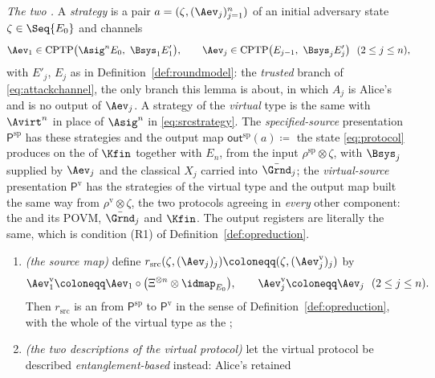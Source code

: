 \begin{lemma}
\emph{The two .} A \emph{strategy}
is a pair
$a=(\zeta,(\Aev_j)_{j=1}^{n})$ of an initial adversary state
$\zeta\in\Seq{E_0}$ and channels
\begin{equation}\label{eq:srcstrategy}
  \Aev_1\in\mathrm{CPTP}\big(\Asig^{n}E_0,\ \Bsys_1E'_1\big),
  \qquad
  \Aev_j\in\mathrm{CPTP}\big(E_{j-1},\ \Bsys_jE'_j\big)\ \ (2\le j\le n),
\end{equation}
with $E'_j$, $E_j$ as in Definition~\ref{def:roundmodel}: the \emph{trusted}
branch of \eqref{eq:attackchannel}, the only branch this lemma is about, in
which $A_j$ is Alice's and is no output of $\Aev_j$. A strategy of the
\emph{virtual} type is the same with $\Avirt^{n}$ in place of $\Asig^{n}$ in
\eqref{eq:srcstrategy}. The \emph{specified-source} presentation
$\mathsf{P}^{\mathrm{sp}}$ has these strategies and the output map
$\mathsf{out}^{\mathrm{sp}}(a)\coloneqq$ the state \eqref{eq:protocol} produces
on the  of $\Kfin$ together with $E_n$, from the input
$\rho^{\mathrm{sp}}\otimes\zeta$, with $\Bsys_j$ supplied by $\Aev_j$ and the
classical $X_j$ carried into $\bar{\Grnd}_j$; the \emph{virtual-source}
presentation $\mathsf{P}^{\mathrm{v}}$ has the strategies of the virtual type
and the output map built the same way from $\rho^{\mathrm{v}}\otimes\zeta$, the
two protocols agreeing in \emph{every} other component: the
 and its POVM, $\bar{\Grnd}_j$ and $\Kfin$. The output registers are literally
the same, which is condition (R1) of Definition~\ref{def:opreduction}.
\begin{enumerate}[label=(\roman*),leftmargin=3.0em]
\item \emph{(the source map)} define
  $r_{\mathrm{src}}(\zeta,(\Aev_j)_j)\coloneqq(\zeta,(\Aev^{\mathrm{v}}_j)_j)$
  by
  \begin{equation}\label{eq:srcmap-strategy}
    \Aev^{\mathrm{v}}_1\coloneqq
      \Aev_1\circ\big(\Xi^{\otimes n}\otimes\idmap_{E_0}\big),
    \qquad
    \Aev^{\mathrm{v}}_j\coloneqq\Aev_j\ \ (2\le j\le n).
  \end{equation}
  Then $r_{\mathrm{src}}$ is an  from
  $\mathsf{P}^{\mathrm{sp}}$ to $\mathsf{P}^{\mathrm{v}}$ in the sense of
  Definition~\ref{def:opreduction}, with the whole of the virtual type as the
  ;
\item \emph{(the two descriptions of the virtual protocol)} let the virtual
  protocol be described \emph{entanglement-based} instead: Alice's retained

\end{enumerate}
\end{lemma}
